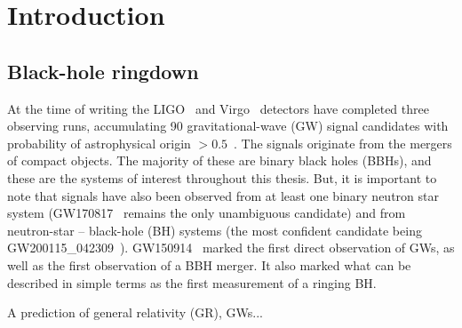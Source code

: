 
\chapter{Introduction} %

\label{Chapter1} %

\section{Black-hole ringdown}


At the time of writing the 
LIGO~\cite{LIGOScientific:2014pky} and Virgo~\cite{VIRGO:2014yos} detectors have completed three observing runs, accumulating 90 gravitational-wave (GW) signal candidates with probability of astrophysical origin $> 0.5$~\cite{LIGOScientific:2018mvr, LIGOScientific:2020ibl, LIGOScientific:2021usb, LIGOScientific:2021djp}.
The signals originate from the mergers of compact objects. 
The majority of these are binary black holes (BBHs), and these are the systems of interest throughout this thesis.  
But, it is important to note that signals have also been observed from at least one binary neutron star system (GW170817~\cite{LIGOScientific:2017vwq} remains the only unambiguous candidate) and from neutron-star -- black-hole (BH) systems (the most confident candidate being GW200115\_042309~\cite{LIGOScientific:2021qlt}).
GW150914~\cite{LIGOScientific:2016aoc} marked the first direct observation of GWs, as well as the first observation of a BBH merger.
It also marked what can be described in simple terms as the first measurement of a ringing BH.

A prediction of general relativity (GR), GWs...

